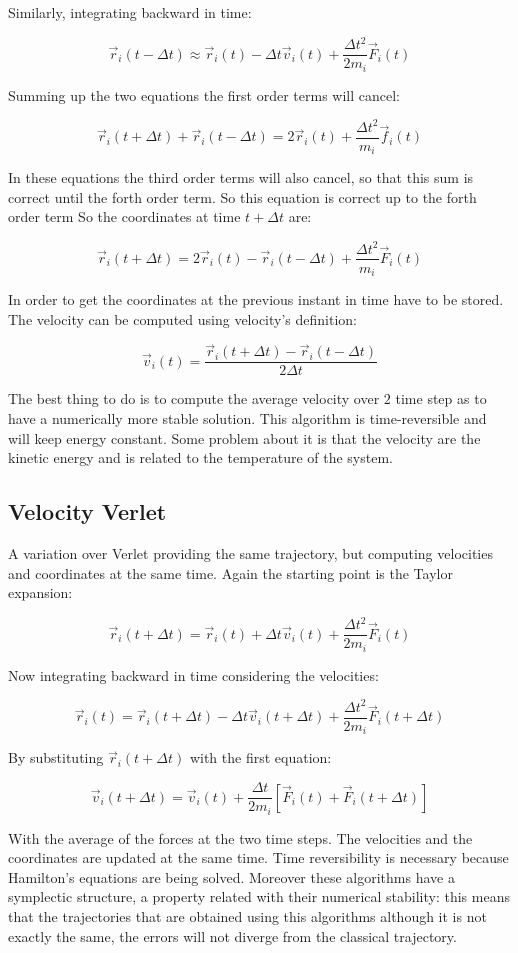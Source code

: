 Similarly, integrating backward in time:

$$\vec{r}_i(t-\Delta t) \approx\vec{r}_i(t)-\Delta t\vec{v}_i(t)+\frac{\Delta t^2}{2m_i}\vec{F}_i(t)$$

Summing up the two equations the first order terms will cancel:

$$\vec{r}_i(t+\Delta t) + \vec{r}_i(t-\Delta t) = 2\vec{r}_i(t) + \frac{\Delta t^2}{m_i}\vec{f}_i(t)$$

In these equations the third order terms will also cancel, so that this sum is correct until the forth order term.
So this equation is correct up to the forth order term
So the coordinates at time $t+\Delta t$ are:

$$\vec{r}_i(t+\Delta t) = 2\vec{r}_i(t) - \vec{r}_i(t-\Delta t) + \frac{\Delta t^2}{m_i}\vec{F}_i(t)$$

In order to get the coordinates at the previous instant in time have to be stored.
The velocity can be computed using velocity's definition:

$$\vec{v}_i(t) = \frac{\vec{r}_i(t+\Delta t)-\vec{r}_i(t-\Delta t)}{2\Delta t}$$

The best thing to do is to compute the average velocity over $2$ time step as to have a numerically more stable solution.
This algorithm is time-reversible and will keep energy constant.
Some problem about it is that the velocity are the kinetic energy and is related to the temperature of the system.

	\subsection{Velocity Verlet}
	A variation over Verlet providing the same trajectory, but computing velocities and coordinates at the same time.
	Again the starting point is the Taylor expansion:

	$$\vec{r}_i(t+\Delta t) = \vec{r}_i(t) + \Delta t\vec{v}_i(t) + \frac{\Delta t^2}{2m_i}\vec{F}_i(t)$$

	Now integrating backward in time considering the velocities:

	$$\vec{r}_i(t) = \vec{r}_i(t+\Delta t) -\Delta t\vec{v}_i(t + \Delta t) + \frac{\Delta t^2}{2m_i}\vec{F}_i(t+\Delta t)$$

	By substituting $\vec{r}_i(t + \Delta t)$ with the first equation:

	$$\vec{v}_i(t+\Delta t) = \vec{v}_i(t) + \frac{\Delta t}{2m_i}[\vec{F}_i(t) + \vec{F}_i(t+\Delta t)]$$

	With the average of the forces at the two time steps.
	The velocities and the coordinates are updated at the same time.
	Time reversibility is necessary because Hamilton's equations are being solved.
	Moreover these algorithms have a symplectic structure, a property related with their numerical stability: this means that the trajectories that are obtained using this algorithms although it is not exactly the same, the errors will not diverge from the classical trajectory.


